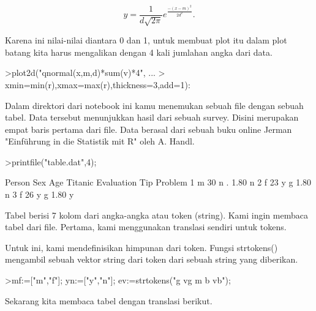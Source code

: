 \documentclass[a4paper,10pt]{article}
\begin{document}
\begin{eulernotebook}
\begin{eulercomment}
\end{eulercomment}
\begin{eulerformula}
\[
y=\frac{1}{d\sqrt{2\pi}}e^{\frac{-(x-m)^2}{2d^2}}.
\]
\end{eulerformula}
\begin{eulercomment}
Karena ini nilai-nilai diantara 0 dan 1, untuk membuat plot itu dalam plot batang kita
harus mengalikan dengan 4 kali jumlahan angka dari data.
\end{eulercomment}
\begin{eulerprompt}
>plot2d("qnormal(x,m,d)*sum(v)*4", ...
>  xmin=min(r),xmax=max(r),thickness=3,add=1):
\end{eulerprompt}
\begin{eulercomment}
Dalam direktori dari notebook ini kamu menemukan sebuah file dengan sebuah tabel. Data
tersebut menunjukkan hasil dari sebuah survey. Disini merupakan empat baris pertama dari
file. Data berasal dari sebuah buku online Jerman "Einführung in die Statistik mit R" oleh
A. Handl.
\end{eulercomment}
\begin{eulerprompt}
>printfile("table.dat",4);
\end{eulerprompt}
\begin{euleroutput}
  Person Sex Age Titanic Evaluation Tip Problem
  1 m 30 n . 1.80 n
  2 f 23 y g 1.80 n
  3 f 26 y g 1.80 y
\end{euleroutput}
\begin{eulercomment}
Tabel berisi 7 kolom dari angka-angka atau token (string). Kami ingin membaca tabel dari
file. Pertama, kami menggunakan translasi sendiri untuk tokens.

Untuk ini, kami mendefinisikan himpunan dari token. Fungsi strtokens() mengambil sebuah
vektor string dari token dari sebuah string yang diberikan.
\end{eulercomment}
\begin{eulerprompt}
>mf:=["m","f"]; yn:=["y","n"]; ev:=strtokens("g vg m b vb");
\end{eulerprompt}
\begin{eulercomment}
Sekarang kita membaca tabel dengan translasi berikut.


\end{eulercomment}
\end{eulernotebook}
\end{document}
